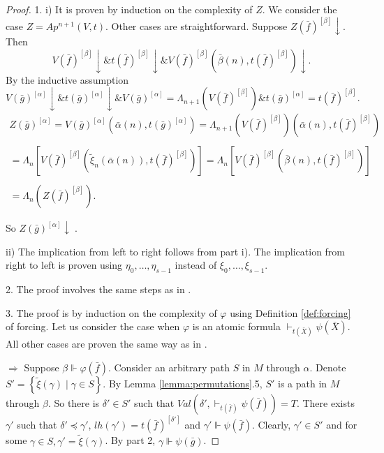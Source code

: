 \documentclass{asl}
\theoremstyle{definition}
\begin{document}
\begin{proof}
1. i) It is proven by induction on the complexity of $ Z $. We consider the case $ Z=Ap^{n+1}(V,t) $. Other cases are straightforward. Suppose $ Z(\bar{f})^{[\beta]}\downarrow $. Then 
\[  V(\bar{f})^{[\beta]}\downarrow \& t(\bar{f})^{[\beta]}\downarrow \& V(\bar{f})^{[\beta]} \left(\bar{\beta}(n),t(\bar{f})^{[\beta]}\right)\downarrow. \]
By the inductive assumption
\[  V(\bar{g})^{[\alpha]}\downarrow \& t(\bar{g})^{[\alpha]}\downarrow \& V(\bar{g})^{[\alpha]}=\Lambda_{n+1} \left( V(\bar{f})^{[\beta]}\right) \& t(\bar{g})^{[\alpha]}=t(\bar{f})^{[\beta]} . \]
\begin{multline*} 
Z(\bar{g})^{[\alpha]}=V(\bar{g})^{[\alpha]} \left(\bar{\alpha}(n),t(\bar{g})^{[\alpha]} \right) = \Lambda_{n+1}\left( V\left( \bar{f}\right) ^{[\beta]}\right)
\left(\bar{\alpha}(n),t(\bar{f})^{[\beta] } \right)
\\ \\
=\Lambda_{n}\left[ V(\bar{f})^{[\beta]}\left(\tilde{\xi}_n \left(\bar{\alpha}(n) \right),t(\bar{f})^{[\beta]}  \right)  \right]   =\Lambda_n  \left[V(\bar{f})^{[\beta]}\left(\bar{\beta}(n), t(\bar{f})^{[\beta]}\right)  \right]
\\ \\
=\Lambda_n \left(Z(\bar{f})^{[\beta]} \right). 
\end{multline*}

 So  $ Z(\bar{g})^{[\alpha]}\downarrow\;. $

ii) The implication from left to right follows from part i). The implication from right to left is proven using $ \eta_{0},\ldots,\eta_{s-1} $ instead of $ \xi_{0},\ldots,\xi_{s-1} $.

2. The proof involves the same steps as in \cite{kach13}. 

3. The proof is by induction on the complexity of $ \varphi $ using Definition \ref{def:forcing} of forcing. Let us consider the case when $ \varphi $ is an atomic formula $ \vdash_{t(\bar{X})} \psi(\bar{X}) $. All other cases are proven the same way as in \cite{kach13}.

$ \Rightarrow $ Suppose $ \beta \Vdash \varphi (\bar{f}) $. Consider an arbitrary path $ S $ in $ M $ through $ \alpha $. Denote $ S'= \left\lbrace \tilde{\xi}(\gamma) \mid \gamma\in S \right\rbrace $. By Lemma \ref{lemma:permutations}.5, $ S' $ is a path in $ M $ through $ \beta $. So there is $ \delta'\in S' $ such that $ Val\left(\delta',\vdash_{t(\bar{f})} \psi(\bar{f}) \right)=T $. There exists $ \gamma' $ such that $ \delta'\preccurlyeq\gamma' $, $lh(\gamma')=t(\bar{f})^{[\delta']}$ and $ \gamma' \Vdash \psi(\bar{f})$. Clearly, $\gamma' \in S'$ and for some $\gamma\in S,\gamma'=\tilde{\xi}(\gamma) $. By part 2, $\gamma \Vdash \psi (\bar{g})$.


\end{proof}
\end{document}
